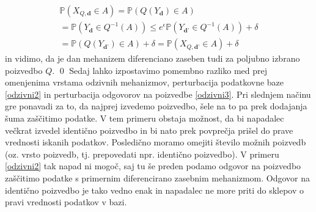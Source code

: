 \documentclass[12pt,a4paper]{amsart}
\theoremstyle{definition} %
\theoremstyle{plain} %
\begin{document}
\begin{gather*}
\mathbb{P}(X_{Q, \textbf{d}} \in A) = \mathbb{P}(Q(Y_{ \textbf{d}}) \in A)  \\ = \mathbb{P}(Y_{\textbf{d}} \in Q^{-1}(A)) 
\leq e^\epsilon \mathbb{P}(Y_{\textbf{d'}} \in Q^{-1}(A)) + \delta \\ 
= \mathbb{P}(Q(Y_\textbf{d'}) \in A) + \delta = \mathbb{P}(X_{Q,\textbf{d'}} \in A) + \delta
\end{gather*}
in vidimo, da je dan mehanizem diferenciano zaseben tudi za poljubno izbrano poizvedbo $Q$.
\qed
\newline
\newline
Sedaj lahko izpostavimo pomembno razliko med prej omenjenima vrstama odzivnih mehanizmov, perturbacija podatkovne baze \eqref{odzivni2} in perturbacija odgovorov na poizvedbe \eqref{odzivni3}. Pri slednjem načinu gre ponavadi za to, da najprej izvedemo poizvedbo, šele na to pa prek dodajanja šuma zaščitimo podatke. V tem primeru obstaja možnost, da bi napadalec večkrat izvedel identično poizvedbo in bi nato prek povprečja prišel do prave vrednosti iskanih podatkov. Posledično moramo omejiti število možnih poizvedb (oz. vrsto poizvedb, tj. prepovedati npr. identično poizvedbo). V primeru \eqref{odzivni2} tak napad ni mogoč, saj tu še preden podamo odgovor na poizvedbo zaščitimo podatke s primernim diferencirano zasebnim mehanizmom. Odgovor na identično poizvedbo je tako vedno enak in napadalec ne more priti do sklepov o pravi vrednosti podatkov v bazi. 
\end{document}
